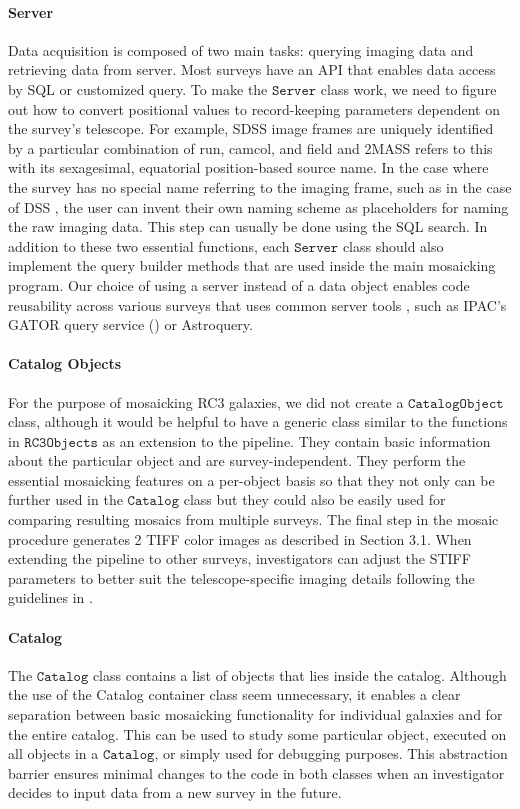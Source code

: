 \documentclass[5p]{elsarticle}
\begin{document}
 		\paragraph{Server}
		Data acquisition is composed of two main tasks: querying imaging data and retrieving data from server. Most surveys have an API that enables data access by SQL or customized query. To make the $\texttt{Server}$ class work, we need to figure out how to convert positional values to record-keeping parameters dependent on the survey's telescope. For example, SDSS image frames are uniquely identified by a particular combination of  run, camcol, and field and 2MASS refers to this with its sexagesimal, equatorial position-based source name. In the case where the survey has no special name referring to the imaging frame, such as in the case of DSS , the user can invent their own naming scheme as placeholders for naming the raw imaging data. This step can usually be done using the SQL search. In addition to these two essential functions, each $\texttt{Server}$ class should also implement the query builder methods that are used inside the main mosaicking program.  Our choice of using a server instead of a data object enables code reusability across various surveys that uses common server tools , such as IPAC's GATOR query service (\citet{irsa}) or  Astroquery.
	\paragraph{Catalog Objects}
	For the purpose of mosaicking RC3 galaxies, we did not create a $\texttt{CatalogObject}$ class, although it would be helpful to have a generic class similar to the functions in $\texttt{RC3Objects}$ as an extension to the pipeline. They contain basic information about the particular object and are survey-independent. They perform the essential mosaicking features on a per-object basis so that  they not only can  be further used in the $\texttt{Catalog}$ class but they could also be easily used for comparing resulting mosaics from multiple surveys. The final step in the mosaic procedure generates 2 TIFF color images as described in Section  3.1\label{sec:tiff_color}.  When extending the pipeline to other surveys, investigators can adjust the STIFF parameters to better suit the telescope-specific imaging details following the guidelines in \citet{stiff}.
	\paragraph{Catalog}
	The $\texttt{Catalog}$ class contains a list of objects that lies inside the catalog. Although the use of the Catalog container class seem unnecessary, it enables a clear separation between basic mosaicking functionality for individual galaxies and for the entire catalog. This can be used to study some particular object, executed on all objects in a $\texttt{Catalog}$, or simply used for debugging purposes. This abstraction barrier ensures minimal changes to the code in both classes when an investigator decides to input data from a new survey in the future.
\end{document}
